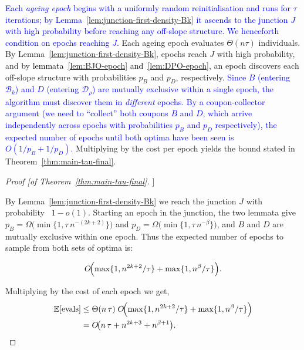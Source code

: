 \textcolor{blue}{Each \emph{ageing epoch} begins with a uniformly random reinitialisation and
runs for $\tau$ iterations; by Lemma~\ref{lem:junction-first-density-Bk} it
ascends to the junction $J$ with high probability before reaching any
off-slope structure.  We henceforth condition on epochs reaching $J$.}
Each ageing epoch evaluates $\Theta(n\tau)$ individuals.
By Lemma~\ref{lem:junction-first-density-Bk}, epochs reach $J$ with high probability, and by \textcolor{black}{lemmata~\ref{lem:BJO-epoch} and~\ref{lem:DPO-epoch}}, an epoch discovers each off-slope structure with probabilities $p_B$ and $p_D$, respectively.
\textcolor{blue}{Since $B$ (entering $\mathcal{B}_k$) and $D$ (entering $\mathcal{D}_\rho$) are
mutually exclusive within a single epoch, the algorithm must discover them in
\emph{different} epochs.
By a coupon-collector argument (we need to ``collect'' both coupons $B$ and
$D$, which arrive independently across epochs with probabilities $p_B$ and
$p_D$ respectively), the expected number of epochs until both optima have been seen
is $O(1/p_B + 1/p_D)$.}
Multiplying by the cost per epoch yields the bound stated in Theorem~\ref{thm:main-tau-final}.

\begin{proof}[Proof [of Theorem~\ref{thm:main-tau-final}]]
	
	By Lemma~\ref{lem:junction-first-density-Bk} we reach the junction $J$ with probability \ \(1-o(1)\).
	Starting an epoch in the junction, %
	the two lemmata give
	$p_B=\Omega\!\bigl(\min\{1,\tau\,n^{-(2k+2)}\}\bigr)$ and
	$p_D=\Omega\!\bigl(\min\{1,\tau\,n^{-\beta}\}\bigr)$,
	and \(B\) and \(D\) are mutually exclusive within one epoch. Thus the expected number of epochs to sample from both sets of optima is:
	
	\[
	O\!\Bigl(
	\max\{1,n^{2k+2}/\tau\}
	+\max\{1,n^{\beta}/\tau\}
	\Bigr).
	\]
	
	Multiplying by the cost of each epoch we get,
	\begin{align*}
		\mathbb{E}[\text{evals}]
		&\le
		\Theta(n\,\tau)\;
		O\!\Bigl(
		\max\{1,n^{2k+2}/\tau\}
		+\max\{1,n^{\beta}/\tau\}
		\Bigr)
		\\&=
		O\!\bigl(
		n\,\tau
		+n^{2k+3}
		+n^{\beta+1}
		\bigr).
	\end{align*}
\end{proof}

